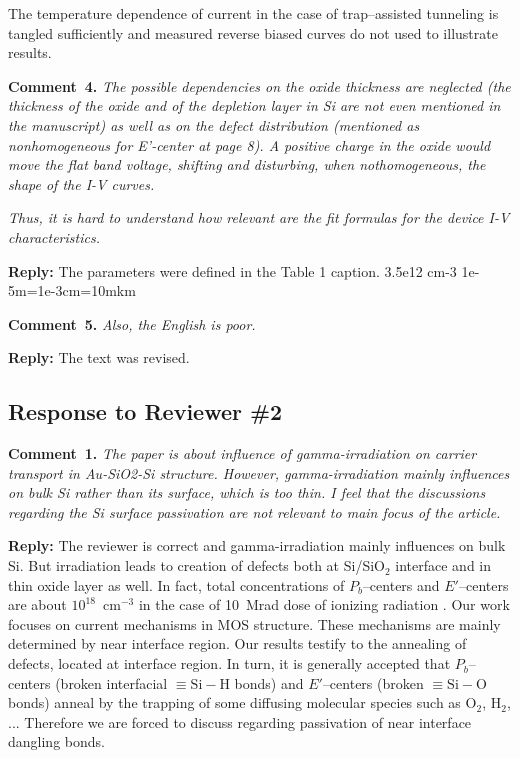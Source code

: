 \documentclass[aip,jap,preprint]{revtex4-1}
\begin{document}
The temperature dependence of current in the case of  trap--assisted tunneling is tangled sufficiently  \cite{TAT:Gilmore,TAT:GopalSST,TAT:Gopal} and
measured reverse biased curves do not used to illustrate  results.


\noindent
\textcolor[rgb]{0.00,0.50,1.00}{\textbf{Comment~4.}}
\emph{The possible dependencies on the oxide thickness are neglected (the thickness of the oxide and of the depletion layer in Si are not even mentioned in the manuscript) as well as on the defect distribution (mentioned as nonhomogeneous for E’-center at page 8). A positive charge in the oxide would move the flat band voltage, shifting and disturbing, when nothomogeneous, the shape of the I-V curves.}

\emph{Thus, it is hard to understand how relevant are the fit formulas for the device I-V characteristics.}


\noindent
\textcolor[rgb]{0.51,0.00,0.00}{\textbf{Reply:}}
The parameters were defined in the Table 1 caption.
3.5e12 cm-3
1e-5m=1e-3cm=10mkm



\noindent
\textcolor[rgb]{0.00,0.50,1.00}{\textbf{Comment~5.}}
\emph{Also, the English is poor.}


\noindent
\textcolor[rgb]{0.51,0.00,0.00}{\textbf{Reply:}}
The text was revised.


\subsection*{Response to Reviewer \#2 }

\noindent
\textcolor[rgb]{0.00,0.50,1.00}{\textbf{Comment~1.}}
\emph{ The paper is about influence of gamma-irradiation on carrier transport in Au-SiO2-Si structure. However, gamma-irradiation mainly influences on bulk Si rather than its surface, which is too thin. I feel that the discussions regarding the Si surface passivation are not relevant to main focus of the article.}

\noindent
\textcolor[rgb]{0.51,0.00,0.00}{\textbf{Reply:}}
The reviewer is correct and gamma-irradiation mainly influences on bulk Si.
But irradiation leads to creation of defects both at Si/SiO$_2$  interface and in thin oxide layer as well.
In fact, total concentrations of $P_b$--centers and $E'$--centers are about $10^{18}$~cm$^{-3}$
in the case of 10~Mrad dose of ionizing radiation \cite{Fleetwood,PersenkovBook}.
Our work focuses on current mechanisms in MOS structure.
These mechanisms are mainly determined by near interface region.
Our results testify to the annealing  of defects, located at interface region.
In turn, it  is generally accepted \cite{SiO2:Devine,SiO2:Mahapatra} that $P_b$--centers (broken interfacial $\equiv\!\mathrm{Si}\!-\!\mathrm{H}$ bonds) and $E'$--centers (broken $\equiv\!\mathrm{Si}\!-\!\mathrm{O}$ bonds) anneal by  the
trapping  of  some  diffusing molecular species  such as  $\text{O}_2$, $\text{H}_2$, ...
Therefore we are forced to discuss regarding passivation of near interface dangling bonds.
\end{document}
